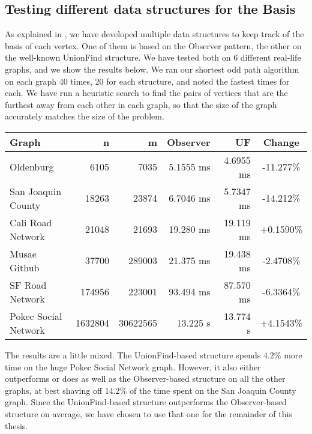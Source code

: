 \subsection{Testing different data structures for the Basis}
\label{subsubsection:testing-basis}
As explained in , we have developed multiple data structures to keep track of the basis of each vertex. One of them is based on the Observer pattern, the other on the well-known UnionFind structure. We have tested both on 6 different real-life graphs, and we show the results below. We ran our shortest odd path algorithm on each graph 40 times, 20 for each structure, and noted the fastest times for each. We have run a heuristic search to find the pairs of vertices that are the furthest away from each other in each graph, so that the size of the graph accurately matches the size of the problem.
\begin{center}
    \begin{tabular}{|l | r | r | r | r | c|} 
     \hline
     Graph & n & m & Observer & UF & Change \\ [0.5ex] 
     \hline\hline
     Oldenburg & 6105 & 7035 & 5.1555 ms & 4.6955 ms & -11.277\%\\ 
     \hline
     San Joaquin County & 18263 & 23874 & 6.7046 ms & 5.7347 ms & -14.212\%\\
     \hline
     Cali Road Network & 21048 & 21693 & 19.280 ms & 19.119 ms & +0.1590\%\\
     \hline
     Musae Github \cite{graph:musae-github} & 37700 & 289003 & 21.375 ms & 19.438 ms & -2.4708\%\\
     \hline
     SF Road Network & 174956 & 223001 & 93.494 ms & 87.570 ms & -6.3364\%\\ [1ex] 
     \hline
     Pokec Social Network \cite{graph:soc-pokec} & 1632804 & 30622565 & 13.225 s & 13.774 s & +4.1543\%\\ [1ex] 
     \hline
    \end{tabular}
\end{center}


The results are a little mixed. The UnionFind-based structure spends $4.2\%$ more time on the huge Pokec Social Network graph. However, it also either outperforms or does as well as the Observer-based structure on all the other graphs, at best shaving off $14.2\%$ of the time spent on the San Joaquin County graph. Since the UnionFind-based structure outperforms the Observer-based structure on average, we have chosen to use that one for the remainder of this thesis.

